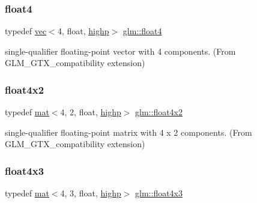 \subsubsection{\texorpdfstring{float4}{float4}}
{\footnotesize\ttfamily typedef \hyperlink{structglm_1_1vec}{vec}$<$4, float, \hyperlink{namespaceglm_a36ed105b07c7746804d7fdc7cc90ff25ac6f7eab42eacbb10d59a58e95e362074}{highp}$>$ \hyperlink{group__gtx__compatibility_ga5b28e8af9bfee363940882dd7d1214b5}{glm\+::float4}}



single-\/qualifier floating-\/point vector with 4 components. (From G\+L\+M\+\_\+\+G\+T\+X\+\_\+compatibility extension) 

\mbox{\label{group__gtx__compatibility_gac7ba369299599a807491b9e871a0184e}} 
\subsubsection{\texorpdfstring{float4x2}{float4x2}}
{\footnotesize\ttfamily typedef \hyperlink{structglm_1_1mat}{mat}$<$4, 2, float, \hyperlink{namespaceglm_a36ed105b07c7746804d7fdc7cc90ff25ac6f7eab42eacbb10d59a58e95e362074}{highp}$>$ \hyperlink{group__gtx__compatibility_gac7ba369299599a807491b9e871a0184e}{glm\+::float4x2}}



single-\/qualifier floating-\/point matrix with 4 x 2 components. (From G\+L\+M\+\_\+\+G\+T\+X\+\_\+compatibility extension) 

\mbox{\label{group__gtx__compatibility_ga656a2d21cf92696b10063da4f431eecd}} 
\subsubsection{\texorpdfstring{float4x3}{float4x3}}
{\footnotesize\ttfamily typedef \hyperlink{structglm_1_1mat}{mat}$<$4, 3, float, \hyperlink{namespaceglm_a36ed105b07c7746804d7fdc7cc90ff25ac6f7eab42eacbb10d59a58e95e362074}{highp}$>$ \hyperlink{group__gtx__compatibility_ga656a2d21cf92696b10063da4f431eecd}{glm\+::float4x3}}




